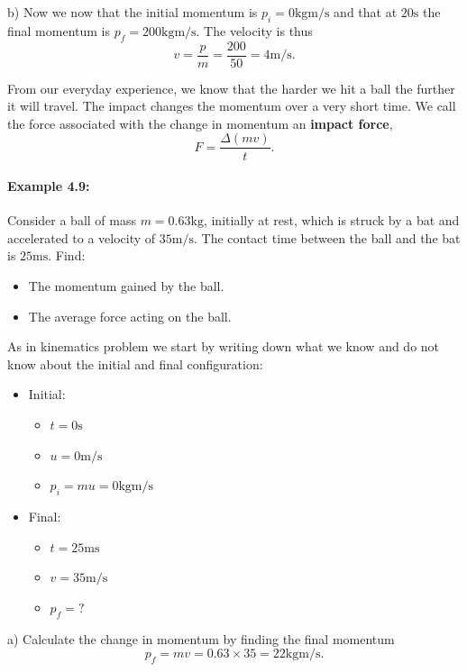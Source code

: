 b) Now we now that the initial momentum is $p_{i}=0\text{kgm/s}$ and that at $20\text{s}$ the final momentum is $p_{f}=200\text{kgm/s}$. The velocity is thus
\begin{equation*}
v=\frac{p}{m}=\frac{200}{50}=4\text{m/s}.
\end{equation*}

From our everyday experience, we know that the harder we hit a ball the further it will travel. The impact changes the momentum over a very short time. We call the force associated with the change in momentum an \textbf{impact force},
\begin{equation*}
F=\frac{\Delta\left(mv\right)}{t}.
\end{equation*}

\paragraph{Example 4.9:} Consider a ball of mass $m=0.63\text{kg}$, initially at rest, which is struck by a bat and accelerated to a velocity of $35\text{m/s}$. The  contact time between the ball and the bat is $25\text{ms}$. Find:
\begin{itemize}
\setlength{\itemsep}{-5pt}
    \item[a)] The momentum gained by the ball.
    \item[b)] The average force acting on the ball.
\end{itemize} 
As in kinematics problem we start by writing down what we know and do not know about the initial and final configuration:
\begin{itemize}
\setlength{\itemsep}{-5pt}
    \item Initial:
    \begin{itemize}
\setlength{\itemsep}{-5pt}
    \item $t=0\text{s}$
    \item $u=0\text{m/s}$
    \item $p_{i}=mu=0\text{kgm/s}$
\end{itemize} 
    \item Final:
    \begin{itemize}
\setlength{\itemsep}{-5pt}
    \item $t=25\text{ms}$
    \item $v=35\text{m/s}$
    \item $p_{f}=?$
\end{itemize} 
\end{itemize} 
a) Calculate the change in momentum by finding the final momentum
\begin{equation*}
p_{f}=mv=0.63\times 35 =22\text{kgm/s}.
\end{equation*}

